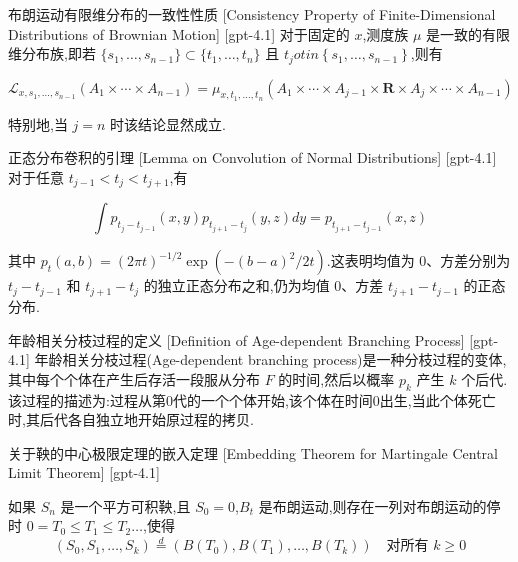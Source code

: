 \documentclass[UTF8]{ctexart}
\begin{document}
    
    
    \begin{ppt}
        {布朗运动有限维分布的一致性性质}
        [Consistency Property of Finite-Dimensional Distributions of Brownian Motion]
        [gpt-4.1]
        对于固定的 $x$,测度族 $\mu$ 是一致的有限维分布族,即若 $\{ s _ { 1 }, \dotsc, s _ { n - 1 } \} \subset \{ t _ { 1 }, \dotsc, t _ { n } \}$ 且 $t _ { j } 
otin \left\{ s _ { 1 }, \ldots, s _ { n - 1 } \right\}$,则有

\[
\mathscr{L}_{x, s_1, \ldots, s_{n-1}} (A_1 \times \cdots \times A_{n-1}) = \mu_{x, t_1, \ldots, t_n} (A_1 \times \cdots \times A_{j-1} \times \mathbf{R} \times A_j \times \cdots \times A_{n-1})
\]

特别地,当 $j = n$ 时该结论显然成立.

    \end{ppt}
    
    
    
    \begin{lma}
        {正态分布卷积的引理}
        [Lemma on Convolution of Normal Distributions]
        [gpt-4.1]
        对于任意 $t_{j-1} < t_j < t_{j+1}$,有

\[
\int p_{t_j - t_{j-1}} (x, y) p_{t_{j+1} - t_j} (y, z) d y = p_{t_{j+1} - t_{j-1}} (x, z)
\]

其中 $p_t(a, b) = (2\pi t)^{-1/2} \exp( - (b - a)^2 / 2t )$.这表明均值为 $0$、方差分别为 $t_j - t_{j-1}$ 和 $t_{j+1} - t_j$ 的独立正态分布之和,仍为均值 $0$、方差 $t_{j+1} - t_{j-1}$ 的正态分布.

    \end{lma}
    
    
    
    \begin{dfn}
        {年龄相关分枝过程的定义}
        [Definition of Age-dependent Branching Process]
        [gpt-4.1]
        年龄相关分枝过程(Age-dependent branching process)是一种分枝过程的变体,其中每个个体在产生后存活一段服从分布 $F$ 的时间,然后以概率 $p_k$ 产生 $k$ 个后代.该过程的描述为:过程从第0代的一个个体开始,该个体在时间0出生,当此个体死亡时,其后代各自独立地开始原过程的拷贝.
    \end{dfn}
    
    
    
    \begin{thm}
        {关于鞅的中心极限定理的嵌入定理}
        [Embedding Theorem for Martingale Central Limit Theorem]
        [gpt-4.1]
        
如果 $S_{ n }$ 是一个平方可积鞅,且 $S_{ 0 } = 0$,$B_{ t }$ 是布朗运动,则存在一列对布朗运动的停时 $0 = T_{ 0 } \leq T_{ 1 } \leq T_{ 2 } \ldots$,使得
\[
( S_{ 0 }, S_{ 1 }, \ldots, S_{ k } ) \stackrel{ d }{ = } ( B( T_{ 0 } ), B( T_{ 1 } ), \ldots, B( T_{ k } ) ) \quad \text{对所有 } k \geq 0
\]

    \end{thm}
    
\end{document}

